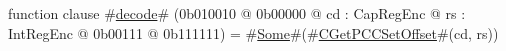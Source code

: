 function clause #\hyperref[sailMIPSzdecode]{decode}# (0b010010 @ 0b00000 @ cd : CapRegEnc @ rs : IntRegEnc @    0b00111 @ 0b111111) = #\hyperref[sailMIPSzSome]{Some}#(#\hyperref[sailMIPSzCGetPCCSetOffset]{CGetPCCSetOffset}#(cd, rs))
